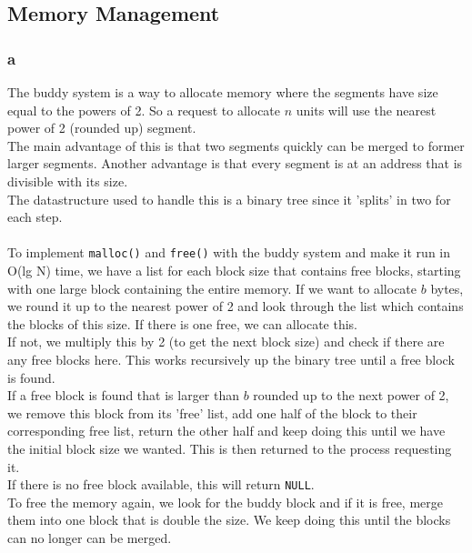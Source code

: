 \documentclass[12pt]{article}
\begin{document}
\subsection{Memory Management}
\subsubsection{a}
The buddy system is a way to allocate memory where the segments have size equal to the powers of 2. So a request to allocate $n$ units will use the nearest power of 2 (rounded up) segment.\\
The main advantage of this is that two segments quickly can be merged to former larger segments. Another advantage is that every segment is at an address that is divisible with its size.\\
The datastructure used to handle this is a binary tree since it 'splits' in two for each step.\\
\\
To implement \texttt{malloc()} and \texttt{free()} with the buddy system and make it run in O(lg N) time, we have a list for each block size that contains free blocks, starting with one large block containing the entire memory. If we want to allocate $b$ bytes, we round it up to the nearest power of 2 and look through the list which contains the blocks of this size. If there is one free, we can allocate this.\\
If not, we multiply this by 2 (to get the next block size) and check if there are any free blocks here. This works recursively up the binary tree until a free block is found.\\
If a free block is found that is larger than $b$ rounded up to the next power of 2, we remove this block from its 'free' list, add one half of the block to their corresponding free list, return the other half and keep doing this until we have the initial block size we wanted. This is then returned to the process requesting it.\\
If there is no free block available, this will return \texttt{NULL}.\\
To free the memory again, we look for the buddy block and if it is free, merge them into one block that is double the size. We keep doing this until the blocks can no longer can be merged.
\end{document}
